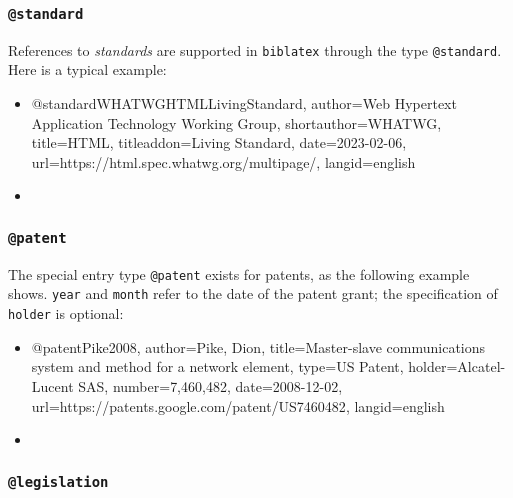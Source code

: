 
\subsubsection{\texttt{\bfseries @standard}}
\label{sec:@standard}

References to \emph{standards} are supported in \texttt{biblatex} through the
type \texttt{@standard}. Here is a typical example:
%
\begin{itemize}
\item[]
\begin{GenericCode}[numbers=none]
@standard{WHATWGHTMLLivingStandard,
  author={{Web Hypertext Application Technology Working Group}},
  shortauthor={WHATWG},
  title={HTML},
  titleaddon={Living Standard},
  date={2023-02-06},
  url={https://html.spec.whatwg.org/multipage/},
  langid={english}
}
\end{GenericCode}
\item[\cite{WHATWGHTMLLivingStandard}] 
\end{itemize}
%


\subsubsection{\texttt{\bfseries @patent}}
\label{sec:@patent}

The special entry type \texttt{@patent} exists for patents, as the following
example shows. \texttt{year} and \texttt{month} refer to the date of the patent
grant; the specification of \texttt{holder} is optional:
%
\begin{itemize}
\item[]
\begin{GenericCode}[numbers=none]
@patent{Pike2008,
  author={Pike, Dion},
  title={Master-slave communications system and method for a network element},
  type={US Patent},
  holder={Alcatel-Lucent SAS},
  number={7,460,482},
  date={2008-12-02},
  url={https://patents.google.com/patent/US7460482},
  langid={english}
}
\end{GenericCode}
\item[\cite{Pike2008}] 
\end{itemize}
%


\subsubsection{\texttt{\bfseries @legislation}}
\label{sec:@legislation}

